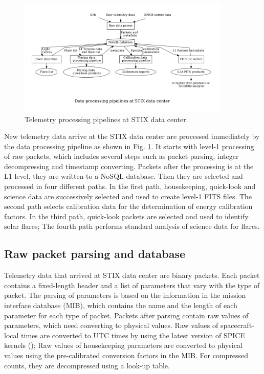 \documentclass[referee]{aa} %
\begin{document}
\begin{figure}
    \centering
    \includegraphics[width=0.9\textwidth]{figures/pipelines.pdf}
    \caption{Telemetry processing pipelines at STIX data center.}
    \label{fig:main_pipelines}
\end{figure}
New telemetry data arrive at the STIX data center are processed immediately by the data processing pipeline  
as shown in Fig. \ref{fig:main_pipelines}. 
It starts with level-1 processing of raw packets, which includes several steps such as  packet parsing, 
integer decompressing and timestamp converting. 
Packets after the processing is at the L1 level, they are written to a NoSQL database. 
Then they are selected and processed in four different paths. 
In the first path,  housekeeping, quick-look and science data are successively selected and 
used to create level-1 FITS files. The second path selects calibration data for the determination
 of energy calibration factors. 
 In the third path, quick-look packets are selected and used to identify solar
flares; The fourth path performs standard analysis of science data for flares.

\subsection{Raw packet parsing and database}
Telemetry data that arrived at STIX data center are binary packets. 
Each packet contains a fixed-length header 
and a list of parameters that vary with the type of packet. 
The parsing of parameters is based on the information in 
the mission interface database (MIB), which contains the name and the 
length of each parameter for each type of packet. 
Packets after parsing contain raw values of parameters, 
which need converting to physical values. 
Raw values of spacecraft-local times are converted to UTC times by using 
the latest version of SPICE kernels (\cite{spice1996,spice2018});
Raw values of housekeeping parameters are converted to physical values using 
the pre-calibrated conversion factors in the MIB. For compressed counts, 
they are decompressed using a look-up table. 
\end{document}
